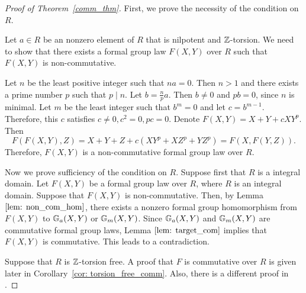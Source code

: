 
\begin{proof}[Proof of Theorem~\ref{comm_thm}]
    First, we prove the necessity of the condition on $R$.\par
    Let $a \in R$ be an nonzero element of $R$ that is nilpotent and $\mathbb{Z}$-torsion. We need to show
    that there exists
    a formal group law $F(X,Y)$ over $R$ such that $F(X,Y)$ is non-commutative. \par
    Let $n$ be the least positive integer such that $n a = 0$. Then $n>1$ and there exists a prime number
    $p$ such that $p \mid n$. Let $b = \frac{n}{p} a$. Then $b\neq 0$ and $p b = 0$, since $n$ is
    minimal. Let $m$ be the least integer such that $b^m= 0$ and let $c = b^{m-1}$. Therefore, this $c$
    satisfies $c \neq 0, c ^ 2 = 0, p c = 0$. Denote $F(X,Y) = X + Y + c X Y ^ p$. Then
    \begin{equation*}
        F(F(X,Y), Z) = X + Y + Z + c(X Y^p+ XZ^p + YZ^p) = F(X,F(Y,Z)).
    \end{equation*}
    Therefore, $F(X,Y)$ is a non-commutative formal group law over $R$.

    Now we prove sufficiency of the condition on $R$. Suppose first that $R$ is a integral domain.
    Let $F(X,Y)$ be a formal
    group law over $R$, where $R$ is an integral domain. Suppose that $F(X,Y)$ is non-commutative.
    Then, by Lemma $\ref{lem: non_com_hom}$, there exists a nonzero formal group homomorphism from $F(X,Y)$ to
    $\mathbb{G}_a(X,Y)$ or $\mathbb{G}_m(X,Y)$. Since $\mathbb{G}_a(X,Y)$ and $\mathbb{G}_m (X,Y)$ are commutative formal group laws,
    Lemma $\ref{lem: target_com}$ implies that $F(X,Y)$ is commutative. This
    leads to a contradiction.\par

    Suppose that $R$ is $\mathbb{Z}$-torsion free. A proof that $F$ is commutative over $R$ is given
    later in Corollary~\ref{cor: torsion_free_comm}.
    Also, there is a different proof in {\cite[Chap.~1 Lemma 6.1.3]{hazewinkel1978formal}}. \par


\end{proof}
